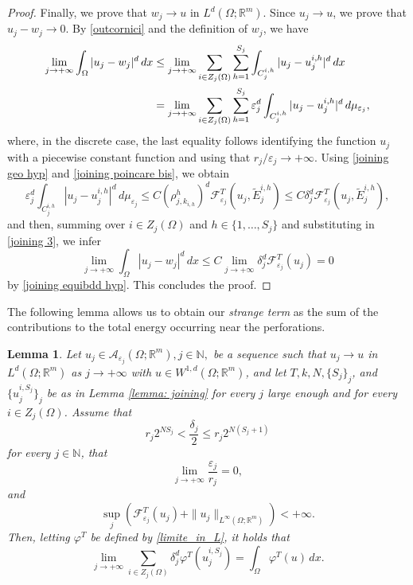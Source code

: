 \documentclass{article}
\theoremstyle{plain}
\newtheorem{lemma}[theorem]{Lemma}
\theoremstyle{definition}
\def\rr{{\mathbb R}}
\def\NN{{\mathbb N}}
\newcommand{\f}{\varphi}
\newcommand{\ej}{\varepsilon_j}
\newcommand{\rj}{r_j}
\newcommand{\dej}{\delta_j}
\newcommand{\F}{\mathcal{F}}
\numberwithin{equation}{section}
\begin{document}
\begin{proof}
Finally, we prove that $w_j\to u$ in $L^d(\Omega;\rr^m)$. Since $u_j\to u$, we prove that $u_j-w_j\to 0$. By \eqref{outcornici} and the definition of $w_j$, we have
\begin{align}\notag
 \lim_{j\to+\infty} \int_\Omega |u_j-w_j|^d\,dx & \leq \lim_{j\to+\infty} \sum_{i\in Z_j(\Omega)} \sum_{h=1}^{S_j} \int_{C_j^{i,h}} |u_j-u_j^{i,h}|^d\,dx \\ \label{joining 3}
  & = \lim_{j\to+\infty} \sum_{i\in Z_j(\Omega)} \sum_{h=1}^{S_j} \ej^d\int_{C_j^{i,h}} |u_j-u^{i,h}_j|^d\, d\mu_{\ej},
\end{align}
where, in the discrete case, the last equality follows identifying the function $u_j$ with a piecewise constant function and using that $\rj/\ej\to+\infty$.
Using \eqref{joining geo hyp} and \eqref{joining poincare bis}, we obtain
\begin{equation*}
     \ej^d\int_{C_j^{i,h}} |u_j-u_j^{i,h}|^d\,d \mu_{\ej}\leq C(\rho^{h}_{j,k_{i,h}})^d \F^T_{\ej}(u_j, \widetilde{E}_j^{i,h})  \leq C \dej^d \F^T_{\ej}(u_j, \widetilde{E}_j^{i,h}),
\end{equation*}
and then, summing over $i\in Z_j(\Omega)$ and $h\in\{1,\dots,S_j\}$ and substituting in \eqref{joining 3}, we infer
\begin{equation*}
     \lim_{j\to+\infty} \int_\Omega |u_j-w_j|^d\,dx \leq C \lim_{j\to+\infty}  \dej^d \F^T_{\ej}(u_j)=0
\end{equation*}
by \eqref{joining equibdd hyp}. This concludes the proof.    
\end{proof}

The following lemma allows us to obtain our {\it strange term} as the sum of the contributions to the total energy occurring near the perforations.

\begin{lemma}\label{lemma: integrale} Let $u_j\in \mathcal{A}_{\varepsilon_j}(\Omega;\mathbb{R}^{m}),j\in\NN,$ be a sequence such that $u_j\rightarrow u$ in $L^{d}(\Omega;\mathbb{R}^{m})$ as $j\to+\infty$ with $u \in W^{1,d}(\Omega;\mathbb{R}^{m})$, and let $T,k,N,\{S_j\}_j$, and $\{u_j^{i,S_j}\}_j$ be as in Lemma \ref{lemma: joining} for every $j$ large enough and for every $i\in Z_j(\Omega)$. Assume that
\begin{equation}\label{stima S_j}
   \rj2^{NS_j}<  \frac{\dej}{2}\leq\rj2^{N(S_j+1)}
\end{equation}
for every $j\in\NN$, that
\begin{equation}\label{hp: e/r bis}
    \lim_{j\to+\infty}\frac{\ej}{\rj}=0,
\end{equation}
and 
\begin{equation}
\label{bd_assumption}
\sup_{j}(\F^T_{\ej}(u_j)+\|u_j\|_{L^{\infty}(\Omega;\rr^m)})<+\infty.
\end{equation}
Then, letting $\f^T$ be defined by \eqref{limite_in_L}, it holds that 
    \begin{equation*}
    \lim_{j\to+\infty} \sum_{i\in Z_j(\Omega)} \dej^d \f^T(u_j^{i,S_j}) = \int_\Omega \f^T(u)\, dx.
\end{equation*}
\end{lemma}
\end{document}
